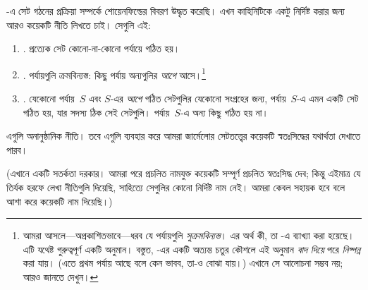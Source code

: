 \documentclass[../../../include/open-logic-section]{subfiles}
\begin{document}

-এ সেট গঠনের প্রক্রিয়া সম্পর্কে
শোয়েনফিল্ডের বিবরণ উদ্ধৃত করেছি। এখন কাহিনিটিকে একটু
নির্দিষ্ট করার জন্য আরও কয়েকটি নীতি লিখতে চাই। সেগুলি এই:
\begin{enumerate}
\item[] \stageshier. প্রত্যেক সেট কোনো-না-কোনো পর্যায়ে গঠিত হয়।
\item[] \stagesord. পর্যায়গুলি ক্রমবিন্যস্ত: কিছু পর্যায় অন্যগুলির
\emph{আগে} আসে।\footnote{আমরা আসলে—অপ্রকাশিতভাবে—ধরব যে
পর্যায়গুলি \emph{সুক্রমবিন্যস্ত}। এর অর্থ কী, তা
-এ ব্যাখ্যা করা হয়েছে। এটি যথেষ্ট
গুরুত্বপূর্ণ একটি অনুমান। বস্তুত, \citet{Scott1974}-এর একটি
অত্যন্ত চতুর কৌশলে এই অনুমান \emph{বাদ দিয়ে} পরে
\emph{নিষ্পন্ন} করা যায়। (এতে প্রথম পর্যায় আছে বলে
কেন ভাবব, তা-ও বোঝা যায়।) এখানে সে আলোচনা সম্ভব নয়;
আরও জানতে \citet{ButtonLT1} দেখুন।}
\item[] \stagesacc. যেকোনো পর্যায়~$S$ এবং $S$-এর
\emph{আগে} গঠিত সেটগুলির যেকোনো সংগ্রহের জন্য, পর্যায়~$S$-এ
এমন একটি সেট গঠিত হয়, যার সদস্য ঠিক সেই সেটগুলি।
পর্যায়~$S$-এ অন্য কিছু গঠিত হয় না।
\end{enumerate}
এগুলি অনানুষ্ঠানিক নীতি। তবে এগুলি ব্যবহার করে আমরা
জার্মেলোর সেটতত্ত্বের কয়েকটি স্বতঃসিদ্ধের যথার্থতা দেখাতে
পারব।

(এখানে একটি সতর্কতা দরকার। আমরা পরে প্রচলিত নামযুক্ত
কয়েকটি সম্পূর্ণ প্রচলিত স্বতঃসিদ্ধ দেব; কিন্তু এইমাত্র
যে তির্যক হরফে লেখা নীতিগুলি দিয়েছি, সাহিত্যে সেগুলির
কোনো নির্দিষ্ট নাম নেই। আমরা কেবল সহায়ক হবে বলে
আশা করে কয়েকটি নাম দিয়েছি।)
\end{document}
